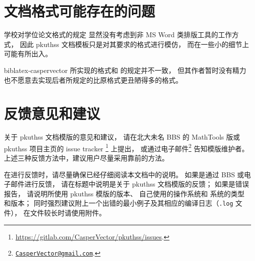 	\section{文档格式可能存在的问题}

	学校对学位论文格式的规定\mbox{\supercite{pku-thesisstyle}}%
	显然没有考虑到非 MS Word 类排版工具的工作方式，
	因此 pkuthss 文档模板只是对其要求的格式进行模仿，
	而在一些小的细节上可能有所出入。

	biblatex-caspervector\supercite{biblatex-caspervector} 所实现的格式和 %
	\parencite{pku-thesisstyle} 的规定并不一致，
	但其作者暂时没有精力也不愿意去实现后者所规定的比原格式更丑陋得多的格式。

	\section{反馈意见和建议}

	关于 pkuthss 文档模版的意见和建议，
	请在北大未名 BBS 的 MathTools 版或 %
	pkuthss 项目主页的 issue tracker%
	\footnote{\url{https://gitlab.com/CasperVector/pkuthss/issues}.}%
	上提出，
	或通过电子邮件\footnote%
	{\href{mailto:CasperVector@gmail.com}{\texttt{CasperVector@gmail.com}}.}%
	告知模版维护者。
	上述三种反馈方法中，建议用户尽量采用靠前的方法。

	在进行反馈时，请尽量确保已经仔细阅读本文档中的说明。
	如果是通过 BBS 或电子邮件进行反馈，
	请在标题中说明是关于 pkuthss 文档模版的反馈；
	如果是错误报告，
	请说明所使用 pkuthss 模版的版本、
	自己使用的操作系统和  系统的类型和版本；
	同时强烈建议附上一个出错的最小例子及其相应的编译日志（\verb|.log| 文件），
	在文件较长时请使用附件。

